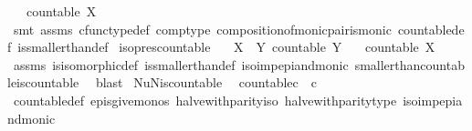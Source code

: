 \begin{isabellebody}
\ \ \ {\isachardoublequoteopen}countable\ X{\isachardoublequoteclose}\isanewline
%
\isadelimproof
\ \ %
\endisadelimproof
%
\isatagproof
{}\isamarkupfalse%
\ {\isacharparenleft}{\kern0pt}smt\ assms\ cfunc{\isacharunderscore}{\kern0pt}type{\isacharunderscore}{\kern0pt}def\ comp{\isacharunderscore}{\kern0pt}type\ composition{\isacharunderscore}{\kern0pt}of{\isacharunderscore}{\kern0pt}monic{\isacharunderscore}{\kern0pt}pair{\isacharunderscore}{\kern0pt}is{\isacharunderscore}{\kern0pt}monic\ countable{\isacharunderscore}{\kern0pt}def\ is{\isacharunderscore}{\kern0pt}smaller{\isacharunderscore}{\kern0pt}than{\isacharunderscore}{\kern0pt}def{\isacharparenright}{\kern0pt}%
\endisatagproof
{\isafoldproof}%
%
\isadelimproof
\isanewline
%
\endisadelimproof
\isanewline
{}\isamarkupfalse%
\ iso{\isacharunderscore}{\kern0pt}pres{\isacharunderscore}{\kern0pt}countable{\isacharcolon}{\kern0pt}\isanewline
\ \ \ {\isachardoublequoteopen}X\ {\isasymcong}\ Y{\isachardoublequoteclose}\ {\isachardoublequoteopen}countable\ Y{\isachardoublequoteclose}\isanewline
\ \ \ {\isachardoublequoteopen}countable\ X{\isachardoublequoteclose}\isanewline
%
\isadelimproof
\ \ %
\endisadelimproof
%
\isatagproof
{}\isamarkupfalse%
\ assms\ is{\isacharunderscore}{\kern0pt}isomorphic{\isacharunderscore}{\kern0pt}def\ is{\isacharunderscore}{\kern0pt}smaller{\isacharunderscore}{\kern0pt}than{\isacharunderscore}{\kern0pt}def\ iso{\isacharunderscore}{\kern0pt}imp{\isacharunderscore}{\kern0pt}epi{\isacharunderscore}{\kern0pt}and{\isacharunderscore}{\kern0pt}monic\ smaller{\isacharunderscore}{\kern0pt}than{\isacharunderscore}{\kern0pt}countable{\isacharunderscore}{\kern0pt}is{\isacharunderscore}{\kern0pt}countable\ \isamarkupfalse%
\ blast%
\endisatagproof
{\isafoldproof}%
%
\isadelimproof
\isanewline
%
\endisadelimproof
\isanewline
{}\isamarkupfalse%
\ NuN{\isacharunderscore}{\kern0pt}is{\isacharunderscore}{\kern0pt}countable{\isacharcolon}{\kern0pt}\isanewline
\ \ {\isachardoublequoteopen}countable{\isacharparenleft}{\kern0pt}{\isasymnat}\isactrlsub c\ {\isasymCoprod}\ {\isasymnat}\isactrlsub c{\isacharparenright}{\kern0pt}{\isachardoublequoteclose}\isanewline
%
\isadelimproof
\ \ %
\endisadelimproof
%
\isatagproof
{}\isamarkupfalse%
\ countable{\isacharunderscore}{\kern0pt}def\ epis{\isacharunderscore}{\kern0pt}give{\isacharunderscore}{\kern0pt}monos\ halve{\isacharunderscore}{\kern0pt}with{\isacharunderscore}{\kern0pt}parity{\isacharunderscore}{\kern0pt}iso\ halve{\isacharunderscore}{\kern0pt}with{\isacharunderscore}{\kern0pt}parity{\isacharunderscore}{\kern0pt}type\ iso{\isacharunderscore}{\kern0pt}imp{\isacharunderscore}{\kern0pt}epi{\isacharunderscore}{\kern0pt}and{\isacharunderscore}{\kern0pt}monic\ \isamarkupfalse%

\end{isabellebody}
